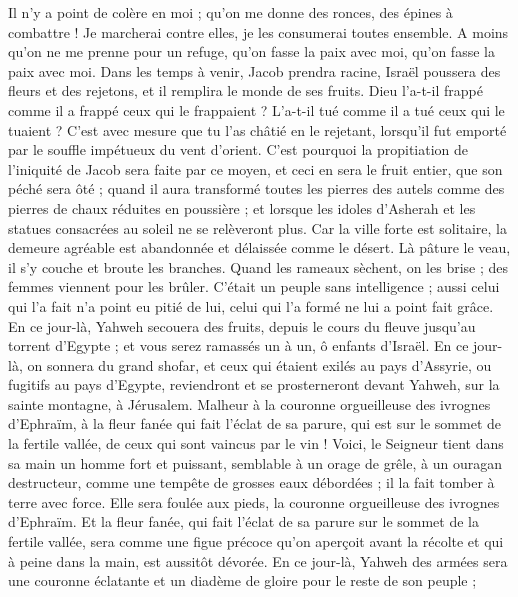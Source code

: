 \begin{multicols}{2}
Il n'y a point de colère en moi ; qu'on me donne des ronces, des épines à combattre ! Je marcherai contre elles, je les consumerai toutes ensemble.
A moins qu'on ne me prenne pour un refuge, qu'on fasse la paix avec moi, qu'on fasse la paix avec moi.
Dans les temps à venir, Jacob prendra racine, Israël poussera des fleurs et des rejetons, et il remplira le monde de ses fruits.
Dieu l'a-t-il frappé comme il a frappé ceux qui le frappaient ? L'a-t-il tué comme il a tué ceux qui le tuaient ?
C'est avec mesure que tu l'as châtié en le rejetant, lorsqu'il fut emporté par le souffle impétueux du vent d'orient.
C'est pourquoi la propitiation de l'iniquité de Jacob sera faite par ce moyen, et ceci en sera le fruit entier, que son péché sera ôté ; quand il aura transformé toutes les pierres des autels comme des pierres de chaux réduites en poussière ; et lorsque les idoles d'Asherah et les statues consacrées au soleil ne se relèveront plus.
Car la ville forte est solitaire, la demeure agréable est abandonnée et délaissée comme le désert. Là pâture le veau, il s'y couche et broute les branches.
Quand les rameaux sèchent, on les brise ; des femmes viennent pour les brûler. C'était un peuple sans intelligence ; aussi celui qui l'a fait n'a point eu pitié de lui, celui qui l'a formé ne lui a point fait grâce.
En ce jour-là, Yahweh secouera des fruits, depuis le cours du fleuve jusqu'au torrent d'Egypte ; et vous serez ramassés un à un, ô enfants d'Israël.
En ce jour-là, on sonnera du grand shofar, et ceux qui étaient exilés au pays d'Assyrie, ou fugitifs au pays d'Egypte, reviendront et se prosterneront devant Yahweh, sur la sainte montagne, à Jérusalem.
\VerseOne{}Malheur à la couronne orgueilleuse des ivrognes d'Ephraïm, à la fleur fanée qui fait l'éclat de sa parure, qui est sur le sommet de la fertile vallée, de ceux qui sont vaincus par le vin !
Voici, le Seigneur tient dans sa main un homme fort et puissant, semblable à un orage de grêle, à un ouragan destructeur, comme une tempête de grosses eaux débordées ; il la fait tomber à terre avec force.
Elle sera foulée aux pieds, la couronne orgueilleuse des ivrognes d'Ephraïm.
Et la fleur fanée, qui fait l'éclat de sa parure sur le sommet de la fertile vallée, sera comme une figue précoce qu'on aperçoit avant la récolte et qui à peine dans la main, est aussitôt dévorée.
En ce jour-là, Yahweh des armées sera une couronne éclatante et un diadème de gloire pour le reste de son peuple ;

\end{multicols}
